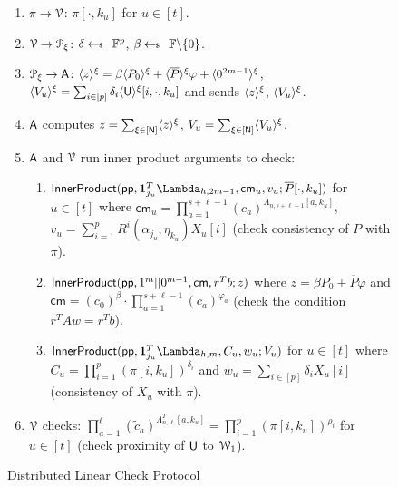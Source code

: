 \begin{figure*}[h!]
{\begin{framed}
\begin{enumerate}[{\rm 1.}]
				\item $\pi\rightarrow\verifier$: $\pi[\cdot,k_u]$ for $u\in [t]$.
				\item $\verifier\rightarrow\distprover$: $\delta\sample \FF^p$, $\beta\sample \FF\backslash \{0\}$.
				\item $\distprover\rightarrow\Ag$: $\shr{z} = \beta\shr{P_0} + \shr{\overline{P}}\varphi + \shr{0^{2m-1}}$, $\shr{V_u} = \sum_{i\in[p]} \delta_i \shr{\ewit}[i,\cdot,k_u]$ and sends $\shr{z}$, $\shr{V_u}$.
				\item  {$\Ag$ computes $z=\sum_{\xi\in[\Num]} \shr{z}$, $V_u=\sum_{\xi\in[\Num]} \shr{V_u}$}.
				\item $\Ag$ and $\verifier$ run inner product arguments to check:
				\begin{enumerate}
					\item $\innerproduct(\mathsf{pp},\bm{1}_{j_u}^T\Lambda_{h,2m-1},\mathsf{cm}_u,v_u;\overline{P}[\cdot,k_u])$ for $u\in [t]$ where $\mathsf{cm}_u=\prod_{a=1}^{s+\ell-1}(c_a)^{\Lambda_{n,s+\ell-1}[a,k_u]}$, $v_u=\sum_{i=1}^pR^i(\alpha_{j_u},\eta_{k_u})X_u[i]$ (check consistency of $P$ with $\pi$).
					\item $\innerproduct(\mathsf{pp},1^m||0^{m-1},\mathsf{cm},r^Tb;z)$ where $z=\beta P_0+\overline{P}\varphi$ and $\mathsf{cm}= (c_0)^{\beta}\cdot\prod_{a=1}^{s+\ell-1}(c_a)^{\varphi_a}$ (check the condition $r^TAw=r^Tb$).
					\item $\innerproduct(\mathsf{pp},\bm{1}_{j_u}^T\Lambda_{h,m},C_u,w_u;V_u)$ for $u\in [t]$ where $C_u=\prod_{i=1}^p(\pi[i,k_u])^{\delta_i}$ and $w_u= \sum_{i\in[p]} \delta_i X_u[i]$(consistency of $X_u$ with $\pi$).
				\end{enumerate}
				\item $\verifier$ checks: $\prod_{a=1}^\ell(\tilde{c}_a)^{\Lambda^T_{n,\ell}[a,k_u]}=\prod_{i=1}^p(\pi[i,k_u])^{\rho_i}$ for $u\in [t]$ (check proximity of $\ewit$ to $\mc{W}_1$).
			\end{enumerate}
		\end{framed}
		\caption{Distributed Linear Check Protocol}
		\label{fig:distlincheck}
	}
\end{figure*}


